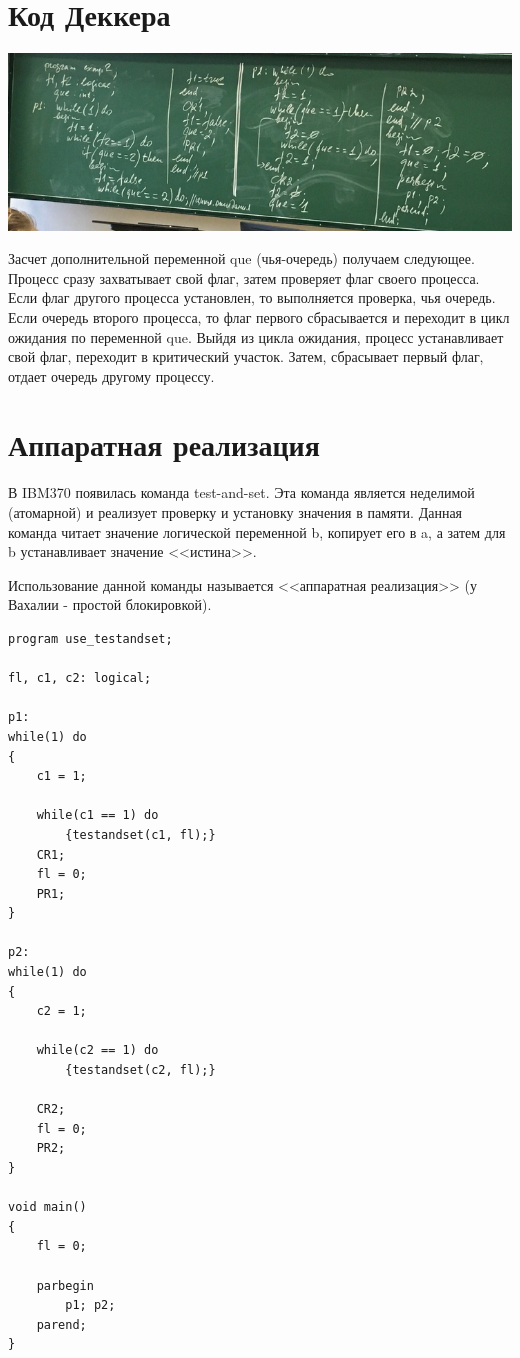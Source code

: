 \documentclass[a4paper, 14pt]{report}
\begin{document}
	\section*{Код Деккера}
	
	\includegraphics[width=\linewidth]{1}
	
	Засчет дополнительной переменной que (чья-очередь) получаем следующее. Процесс сразу захватывает свой флаг, затем проверяет флаг своего процесса. Если флаг другого процесса установлен, то выполняется проверка, чья очередь. Если очередь второго процесса, то флаг первого сбрасывается и переходит в цикл ожидания по переменной que. Выйдя из цикла ожидания, процесс устанавливает свой флаг, переходит в критический участок. Затем, сбрасывает первый флаг, отдает очередь другому процессу.
	
	\section*{Аппаратная реализация}
	
	В IBM370 появилась команда test-and-set. Эта команда является неделимой (атомарной) и реализует проверку и установку значения в памяти. Данная команда читает значение логической переменной b, копирует его в a, а затем для b устанавливает значение <<истина>>.
	
	Использование данной команды называется <<аппаратная реализация>> (у Вахалии - простой блокировкой).
	
	\begin{lstlisting}
program use_testandset;

fl, c1, c2: logical;

p1:
while(1) do
{
	c1 = 1;
	
	while(c1 == 1) do
		{testandset(c1, fl);}
	CR1;
	fl = 0;
	PR1;
}

p2:
while(1) do
{
	c2 = 1;
	
	while(c2 == 1) do
		{testandset(c2, fl);}
	
	CR2;
	fl = 0;
	PR2;
}

void main()
{
	fl = 0;
	
	parbegin
		p1; p2;
	parend;
}
	\end{lstlisting}
\end{document}
